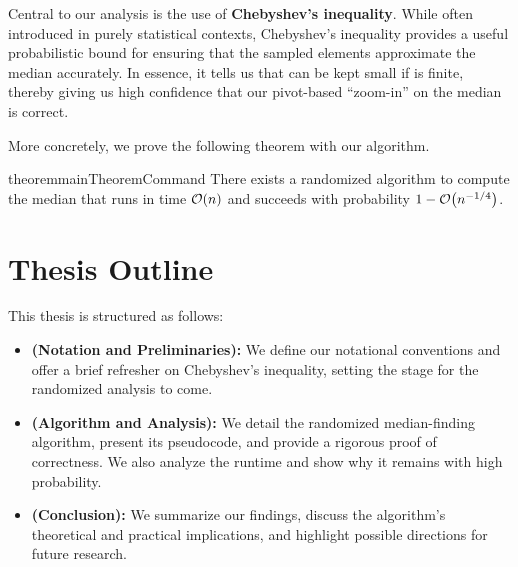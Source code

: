 Central to our analysis is the use of \textbf{Chebyshev’s inequality}. While often introduced in purely statistical contexts, Chebyshev’s inequality provides a useful probabilistic bound for ensuring that the sampled elements approximate the median accurately. In essence, it tells us that  can be kept small if  is finite, thereby giving us high confidence that our pivot-based “zoom-in” on the median is correct.

More concretely, we prove the following theorem with our algorithm.

\begin{restatable}{theorem}{mainTheoremCommand}
    \label{theorem:mainTheorem}
    There exists a randomized algorithm to compute the median that runs in time $\Oh*{n}$ and succeeds with probability $1 - \Oh*{n^{-1/4}}$.
\end{restatable}

\section*{Thesis Outline}

This thesis is structured as follows:
\begin{itemize}
    \item \textbf{ (Notation and Preliminaries):} We define our notational conventions and offer a brief refresher on Chebyshev’s inequality, setting the stage for the randomized analysis to come.
    \item \textbf{ (Algorithm and Analysis):} We detail the randomized median-finding algorithm, present its pseudocode, and provide a rigorous proof of correctness. We also analyze the runtime and show why it remains  with high probability.
    \item \textbf{ (Conclusion):} We summarize our findings, discuss the algorithm’s theoretical and practical implications, and highlight possible directions for future research.
\end{itemize}

